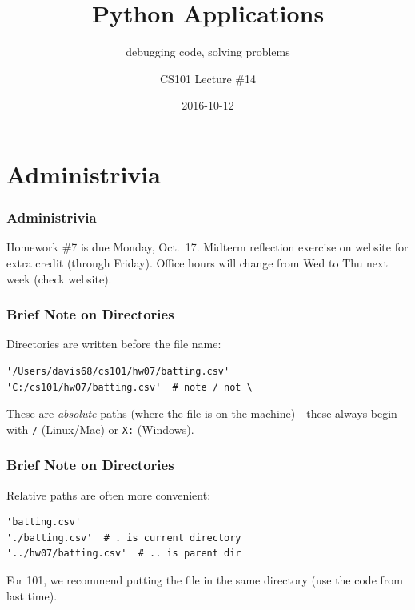 \documentclass[11pt]{beamer}
\title{Python Applications}
\subtitle{debugging code, solving problems}
\author{CS101 Lecture \#14}
\date{2016-10-12}
\begin{document}
  \setcounter{showProgressBar}{0}
  \setcounter{showSlideNumbers}{0}

\frame{\titlepage}

\setcounter{framenumber}{0}
\setcounter{showProgressBar}{1}
\setcounter{showSlideNumbers}{1}

\section{Administrivia}

\begin{frame}
  \frametitle{Administrivia}
  \Enlarge

  \begin{itemize}
  \myitem  Homework \#7 is due Monday, Oct.\ 17.
  \myitem  Midterm reflection exercise on website for extra credit (through Friday).
  \myitem  Office hours will change from Wed to Thu next week (check website).
  \end{itemize}
\end{frame}

\begin{frame}[fragile]
  \frametitle{Brief Note on Directories}
  \Enlarge

  \begin{itemize}
  \myitem  Directories are written before the file name:
    \begin{Verbatim}
'/Users/davis68/cs101/hw07/batting.csv'
'C:/cs101/hw07/batting.csv'  # note / not \
    \end{Verbatim}
  \myitem  These are \emph{absolute} paths (where the file is on the machine)---these always begin with \texttt{/} (Linux/Mac) or \texttt{X:} (Windows).
  \end{itemize}
\end{frame}

\begin{frame}[fragile]
  \frametitle{Brief Note on Directories}
  \Enlarge

  \begin{itemize}
  \myitem  Relative paths are often more convenient:
    \begin{Verbatim}
'batting.csv'
'./batting.csv'  # . is current directory
'../hw07/batting.csv'  # .. is parent dir
    \end{Verbatim}
  \myitem  For 101, we recommend putting the file in the same directory (use the code from last time).
  \end{itemize}
\end{frame}
\end{document}
